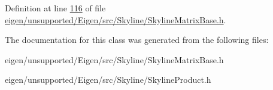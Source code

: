 Definition at line \hyperlink{eigen_2unsupported_2_eigen_2src_2_skyline_2_skyline_matrix_base_8h_source_l00116}{116} of file \hyperlink{eigen_2unsupported_2_eigen_2src_2_skyline_2_skyline_matrix_base_8h_source}{eigen/unsupported/\+Eigen/src/\+Skyline/\+Skyline\+Matrix\+Base.\+h}.



The documentation for this class was generated from the following files\+:\begin{DoxyCompactItemize}
\item 
eigen/unsupported/\+Eigen/src/\+Skyline/\+Skyline\+Matrix\+Base.\+h\item 
eigen/unsupported/\+Eigen/src/\+Skyline/\+Skyline\+Product.\+h\end{DoxyCompactItemize}
